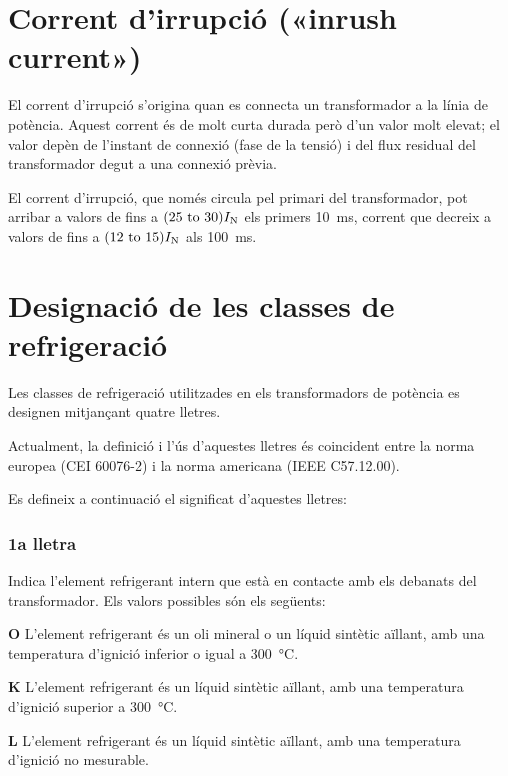 \section{Corrent d'irrupció («inrush current»)}

El corrent d'irrupció s'origina quan es  connecta un transformador a la línia de potència. Aquest corrent és de molt curta durada però d'un valor molt elevat; el valor depèn de l'instant de connexió (fase de la tensió) i del flux residual del transformador degut a una connexió prèvia.

El corrent d'irrupció, que només circula pel primari del transformador, pot arribar a valors de fins a $(\numrange{25}{30}) I\ped{N}$ els primers \SI{10}{ms}, corrent que decreix a valors de fins  a $(\numrange{12}{15}) I\ped{N}$ als \SI{100}{ms}.

\section{Designació de les classes de refrigeració}\label{sec:trafos-pot-refrig}
 

Les classes de refrigeració utilitzades en els transformadors de
potència es designen mitjançant quatre lletres.

Actualment, la definició i l'ús d'aquestes lletres és coincident
entre la norma europea (CEI 60076-2) i la norma americana
(IEEE C57.12.00).

Es defineix a continuació el significat d'aquestes lletres:

\subsubsection*{1a lletra}
Indica l'element refrigerant intern que està en
contacte amb els debanats del transformador. Els valors possibles
són els següents:

\begin{list}{}
   {\setlength{\labelwidth}{10mm} \setlength{\leftmargin}{10mm} \setlength{\labelsep}{2mm}}
   \item[\textbf{O}] L'element refrigerant és un oli mineral o un líquid sintètic aïllant, amb una temperatura d'ignició
   inferior o igual a \SI{300}{\degreeCelsius}.
   \item[\textbf{K}] L'element refrigerant és un líquid sintètic aïllant, amb una temperatura d'ignició
   superior a \SI{300}{\degreeCelsius}.
   \item[\textbf{L}] L'element refrigerant és un líquid sintètic aïllant, amb una temperatura d'ignició
   no mesurable.
\end{list}
  

